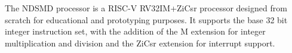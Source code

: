 
The NDSMD processor is a RISC-V RV32IM+ZiCsr processor designed from scratch for educational and prototyping purposes.
It supports the base 32 bit integer instruction set, with the addition of the M extension for integer multiplication 
and division and the ZiCsr extension for interrupt support. 